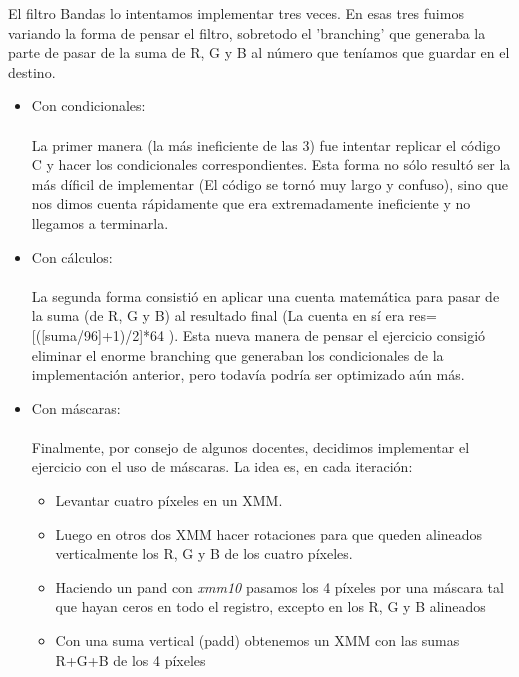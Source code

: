 \documentclass[a4paper]{article}
\begin{document}
El filtro Bandas lo intentamos implementar tres veces. En esas tres fuimos variando la forma de pensar el filtro, sobretodo el 'branching' que generaba la parte de pasar de la suma de R, G y B al n\'{u}mero que ten\'{i}amos que guardar en el destino.\\
\begin{itemize}
\item Con condicionales: \\ \\
 La primer manera (la m\'{a}s ineficiente de las 3) fue intentar replicar el c\'{o}digo C y hacer los condicionales correspondientes. Esta forma no s\'{o}lo result\'{o} ser la m\'{a}s d\'{i}ficil de implementar (El c\'{o}digo se torn\'{o} muy largo y confuso), sino que nos dimos cuenta r\'{a}pidamente que era extremadamente ineficiente y no llegamos a terminarla. \\
\item Con c\'{a}lculos: \\ \\
 La segunda forma consisti\'{o} en aplicar una cuenta matem\'{a}tica para pasar de la suma (de R, G y B) al resultado final (La cuenta en s\'{i} era res=[([suma/96]+1)/2]*64 ). Esta nueva manera de pensar el ejercicio consigi\'{o} eliminar el enorme branching que generaban los condicionales de la implementaci\'{o}n anterior, pero todav\'{i}a podr\'{i}a ser optimizado a\'{u}n m\'{a}s.
\item Con m\'{a}scaras: \\ \\
Finalmente, por consejo de algunos docentes, decidimos implementar el ejercicio con el uso de m\'{a}scaras. La idea es, en cada iteraci\'{o}n: \\
\begin{itemize}
\item Levantar cuatro p\'{i}xeles en un XMM.\\
\item Luego en otros dos XMM hacer rotaciones para que queden alineados verticalmente los R, G y B de los cuatro p\'{i}xeles. \\
\item Haciendo un pand con \textit{xmm10} pasamos los 4 p\'{i}xeles por una m\'{a}scara tal que hayan ceros en todo el registro, excepto en los R, G y B alineados
\item Con una suma vertical (padd) obtenemos un XMM con las sumas R+G+B de los 4 p\'{i}xeles



\end{itemize}
\end{itemize}
\end{document}
